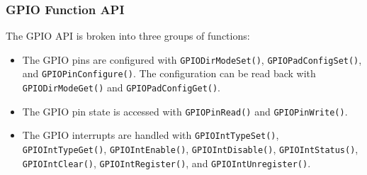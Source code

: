 \documentclass{article}
\begin{document}
\subsubsection{GPIO Function API}
The GPIO API is broken into three groups of functions:
\begin{itemize}
    \item The GPIO pins are configured with
          \texttt{GPIODirModeSet()},
          \texttt{GPIOPadConfigSet()}, and
          \texttt{GPIOPinConfigure()}. The configuration can be
          read back with \texttt{GPIODirModeGet()} and
          \texttt{GPIOPadConfigGet()}.
    \item The GPIO pin state is accessed with
          \texttt{GPIOPinRead()} and
          \texttt{GPIOPinWrite()}.
    \item The GPIO interrupts are handled with
          \texttt{GPIOIntTypeSet()},
          \texttt{GPIOIntTypeGet()},
          \texttt{GPIOIntEnable()},
          \texttt{GPIOIntDisable()},
          \texttt{GPIOIntStatus()},
          \texttt{GPIOIntClear()},
          \texttt{GPIOIntRegister()}, and
          \texttt{GPIOIntUnregister()}.
\end{itemize}
\end{document}
